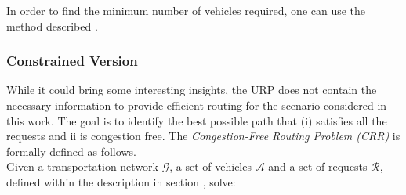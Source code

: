 
In order to find the minimum number of vehicles required, one can use the method described . 
\subsubsection*{Constrained Version}
While it could bring some interesting insights, the URP does not contain the necessary information to provide efficient routing for the scenario considered in this work. The goal is to identify the best possible path that \textup{(i)} satisfies all the requests and \textup{ii} is congestion free. The \textit{Congestion-Free Routing Problem (CRR)} is formally defined as follows.\\ Given a transportation network $\mathcal{G}$, a set of vehicles $\mathcal{A}$ and a set of requests $\mathcal{R}$, defined within the description in section , solve:

